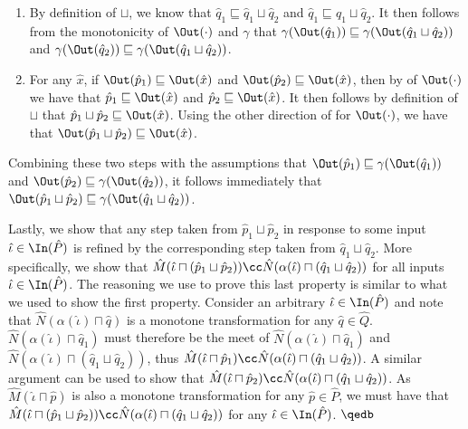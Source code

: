 \begin{enumerate}

\item By definition of $\sqcup$, we know that $\hat q_{1} \sqsubseteq \hat q_{1} \sqcup \hat q_{2}$ and $\hat q_{1} \sqsubseteq \hat q_{1} \sqcup \hat q_{2}$. It then follows from the monotonicity of $\Out(\cdot)$ and $\gamma$ that $\gamma(\Out(\hat q_{1})) \sqsubseteq \gamma(\Out(\hat q_{1} \sqcup \hat q_{2}))$ and $\gamma(\Out(\hat q_{2})) \sqsubseteq \gamma(\Out(\hat q_{1} \sqcup \hat q_{2}))$.

\item For any $\hat x$, if $\Out(\hat p_{1}) \sqsubseteq \Out(\hat x)$ and $\Out(\hat p_{2}) \sqsubseteq \Out(\hat x)$, then by  of $\Out(\cdot)$ we have that $\hat p_{1} \sqsubseteq \Out(\hat x)$ and $\hat p_{2} \sqsubseteq \Out(\hat x)$. It then follows by definition of $\sqcup$ that $\hat p_{1} \sqcup \hat p_{2} \sqsubseteq \Out(\hat x)$. Using the other direction of  for $\Out(\cdot)$, we have that $\Out(\hat p_{1} \sqcup \hat p_{2}) \sqsubseteq \Out(\hat x)$.

\end{enumerate}


\noindent Combining these two steps with the assumptions that $\Out(\hat p_{1}) \sqsubseteq \gamma(\Out(\hat q_{1}))$ and $\Out(\hat p_{2}) \sqsubseteq \gamma(\Out(\hat q_{2}))$, it follows immediately that $\Out(\hat p_{1} \sqcup \hat p_{2}) \sqsubseteq \gamma(\Out(\hat q_{1} \sqcup \hat q_{2}))$.

Lastly, we show that any step taken from $\hat p_{1} \sqcup \hat p_{2}$ in response to some input $\hat \iota \in \In(\hat P)$ is refined by the corresponding step taken from $\hat q_{1} \sqcup \hat q_{2}$. More specifically, we show that $\hat M(\hat \iota \sqcap (\hat p_{1} \sqcup \hat p_{2})) \cc \hat N(\alpha(\hat \iota) \sqcap (\hat q_{1} \sqcup \hat q_{2}))$ for all inputs $\hat \iota \in \In(\hat P)$. The reasoning we use to prove this last property is similar to what we used to show the first property. Consider an arbitrary $\hat \iota \in \In(\hat P)$ and note that $\hat N(\alpha(\hat \iota) \sqcap \hat q)$ is a monotone transformation for any $\hat q \in \hat Q$. $\hat N(\alpha(\hat \iota) \sqcap \hat q_{1})$ must therefore be the meet of $\hat N(\alpha(\hat \iota) \sqcap \hat q_{1})$ and $\hat N(\alpha(\hat \iota) \sqcap (\hat q_{1} \sqcup \hat q_{2}))$, thus $\hat M(\hat \iota \sqcap \hat p_{1}) \cc \hat N(\alpha(\hat \iota) \sqcap (\hat q_{1} \sqcup \hat q_{2}))$. A similar argument can be used to show that $\hat M(\hat \iota \sqcap \hat p_{2}) \cc \hat N(\alpha(\hat \iota) \sqcap (\hat q_{1} \sqcup \hat q_{2}))$. As $\hat M(\hat \iota \sqcap \hat p)$ is also a monotone transformation for any $\hat p \in \hat P$, we must have that $\hat M(\hat \iota \sqcap (\hat p_{1} \sqcup \hat p_{2})) \cc \hat N(\alpha(\hat \iota) \sqcap (\hat q_{1} \sqcup \hat q_{2}))$ for any $\hat \iota \in \In(\hat P)$. $\qedb$

